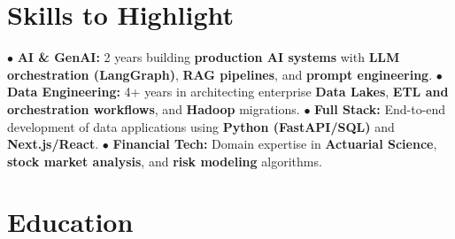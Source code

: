 \documentclass[letterpaper]{twentysecondcv} %
\begin{document}
\makeprofile %

\section{Skills to Highlight}

$\bullet$ \textbf{AI \& GenAI:} 2 years building \textbf{production AI systems} with \textbf{LLM orchestration (LangGraph)}, \textbf{RAG pipelines}, and \textbf{prompt engineering}. \newline
$\bullet$ \textbf{Data Engineering:} 4+ years in architecting enterprise \textbf{Data Lakes}, \textbf{ETL and orchestration workflows}, and \textbf{Hadoop} migrations. \newline
$\bullet$ \textbf{Full Stack:} End-to-end development of data applications using \textbf{Python (FastAPI/SQL)} and \textbf{Next.js/React}. \newline
$\bullet$ \textbf{Financial Tech:} Domain expertise in \textbf{Actuarial Science}, \textbf{stock market analysis}, and \textbf{risk modeling} algorithms. \newline



\section{Education}

\begin{twenty} 
\end{twenty}

\end{document}
